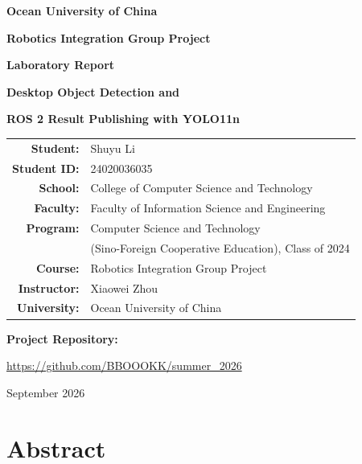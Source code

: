 \documentclass[12pt,a4paper]{article}
\renewcommand{\arraystretch}{1.12}
\begin{document}
\begin{titlepage}
\thispagestyle{empty}
\centering
\vspace*{0.35cm}
{\LARGE\bfseries Ocean University of China\par}
\vspace{0.45cm}
{\Large\bfseries Robotics Integration Group Project\par}
\vspace{0.18cm}
{\Large\bfseries Laboratory Report\par}
\vspace{1.0cm}
{\LARGE\bfseries Desktop Object Detection and\par}
\vspace{0.18cm}
{\LARGE\bfseries ROS 2 Result Publishing with YOLO11n\par}
\vspace{1.05cm}
\begingroup
\renewcommand{\arraystretch}{1.42}
\large
\begin{tabular}{>{\bfseries}r l}
Student: & Shuyu Li \\
Student ID: & 24020036035 \\
School: & College of Computer Science and Technology \\
Faculty: & Faculty of Information Science and Engineering \\
Program: & Computer Science and Technology \\
 & (Sino-Foreign Cooperative Education), Class of 2024 \\
Course: & Robotics Integration Group Project \\
Instructor: & Xiaowei Zhou \\
University: & Ocean University of China \\
\end{tabular}
\endgroup
\par
\vspace{0.4cm}
{\normalsize\textbf{Project Repository:}\par}
\vspace{0.08cm}
{\normalsize\url{https://github.com/BBOOOKK/summer_2026}\par}
\vfill
{\large September 2026\par}
\end{titlepage}

\section*{Abstract}
\end{document}
